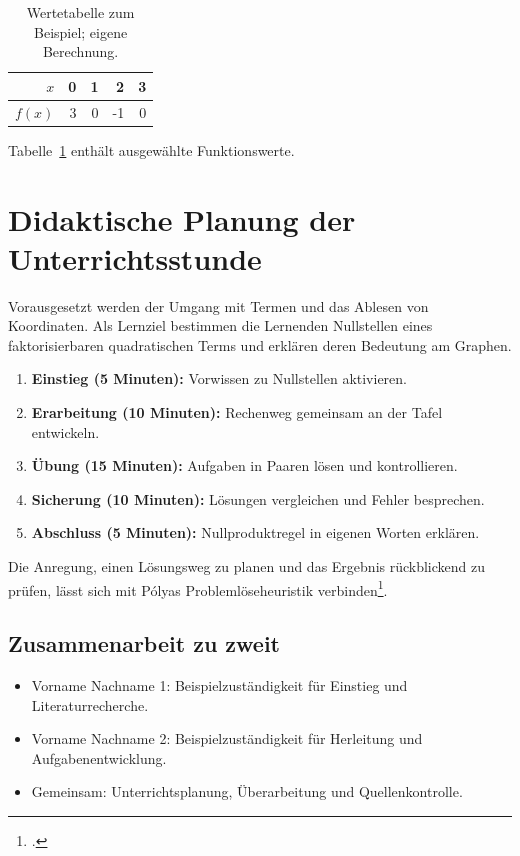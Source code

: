 \documentclass[12pt,a4paper,ngerman]{scrartcl}
\theoremstyle{definition}
\newcommand{\personA}{Vorname Nachname 1}
\newcommand{\personB}{Vorname Nachname 2}
\begin{document}
\begin{table}[htbp]
  \centering
  \caption{Wertetabelle zum Beispiel; eigene Berechnung.}
  \label{tab:werte}
  \begin{tabular}{@{}rrrrr@{}}
    \toprule
    \(x\) & 0 & 1 & 2 & 3 \\
    \midrule
    \(f(x)\) & 3 & 0 & -1 & 0 \\
    \bottomrule
  \end{tabular}
\end{table}
Tabelle~\ref{tab:werte} enthält ausgewählte Funktionswerte.

\section{Didaktische Planung der Unterrichtsstunde}
Vorausgesetzt werden der Umgang mit Termen und das Ablesen von Koordinaten.
Als Lernziel bestimmen die Lernenden Nullstellen eines faktorisierbaren
quadratischen Terms und erklären deren Bedeutung am Graphen.
\begin{enumerate}
  \item \textbf{Einstieg (5 Minuten):} Vorwissen zu Nullstellen aktivieren.
  \item \textbf{Erarbeitung (10 Minuten):} Rechenweg gemeinsam an der Tafel entwickeln.
  \item \textbf{Übung (15 Minuten):} Aufgaben in Paaren lösen und kontrollieren.
  \item \textbf{Sicherung (10 Minuten):} Lösungen vergleichen und Fehler besprechen.
  \item \textbf{Abschluss (5 Minuten):} Nullproduktregel in eigenen Worten erklären.
\end{enumerate}
Die Anregung, einen Lösungsweg zu planen und das Ergebnis rückblickend zu prüfen,
lässt sich mit Pólyas Problemlöseheuristik verbinden\footcite{polya1945}.

\subsection{Zusammenarbeit zu zweit}
\begin{itemize}
  \item \personA: Beispielzuständigkeit für Einstieg und Literaturrecherche.
  \item \personB: Beispielzuständigkeit für Herleitung und Aufgabenentwicklung.
  \item Gemeinsam: Unterrichtsplanung, Überarbeitung und Quellenkontrolle.
\end{itemize}
\end{document}

